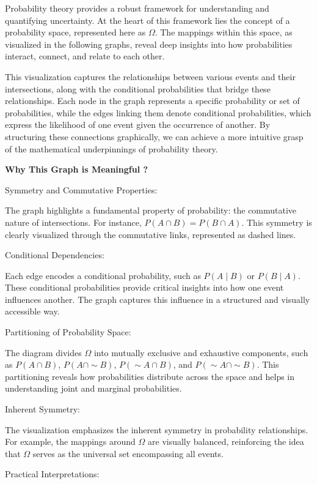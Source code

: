 \documentclass[
  12 pt,
  a4paper,
]{book}
\numberwithin{equation}{section}
\theoremstyle{plain}      %
\theoremstyle{definition} %
\theoremstyle{remark}     %
\theoremstyle{note}         %
\begin{document}
Probability theory provides a robust framework for understanding and
quantifying uncertainty. At the heart of this framework lies the concept
of a probability space, represented here as \(\Omega\). The mappings
within this space, as visualized in the following graphs, reveal deep
insights into how probabilities interact, connect, and relate to each
other.

This visualization captures the relationships between various events and
their intersections, along with the conditional probabilities that
bridge these relationships. Each node in the graph represents a specific
probability or set of probabilities, while the edges linking them denote
conditional probabilities, which express the likelihood of one event
given the occurrence of another. By structuring these connections
graphically, we can achieve a more intuitive grasp of the mathematical
underpinnings of probability theory.

\textbf{Why This Graph is Meaningful ?}

Symmetry and Commutative Properties:

The graph highlights a fundamental property of probability: the
commutative nature of intersections. For instance,
\(P(A \cap B) = P(B \cap A)\). This symmetry is clearly visualized
through the commutative links, represented as dashed lines.

Conditional Dependencies:

Each edge encodes a conditional probability, such as \(P(A \mid B)\) or
\(P(B \mid A)\). These conditional probabilities provide critical
insights into how one event influences another. The graph captures this
influence in a structured and visually accessible way.

Partitioning of Probability Space:

The diagram divides \(\Omega\) into mutually exclusive and exhaustive
components, such as \(P(A \cap B)\), \(P(A \cap \sim B)\),
\(P(\sim A \cap B)\), and \(P(\sim A \cap \sim B)\). This partitioning
reveals how probabilities distribute across the space and helps in
understanding joint and marginal probabilities.

Inherent Symmetry:

The visualization emphasizes the inherent symmetry in probability
relationships. For example, the mappings around \(\Omega\) are visually
balanced, reinforcing the idea that \(\Omega\) serves as the universal
set encompassing all events.

Practical Interpretations:
\end{document}
